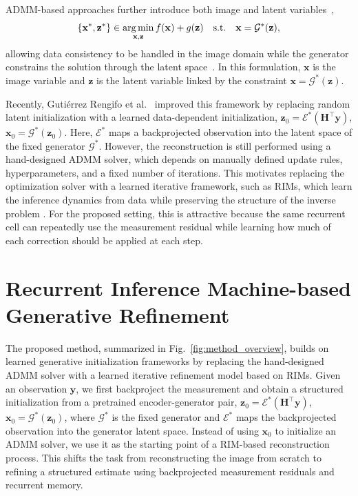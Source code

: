 \documentclass[conference]{IEEEtran}
\DeclareMathOperator*{\argmin}{arg\,min}
\begin{document}
ADMM-based approaches further introduce both image and latent variables~\cite{gutierrez2025learned},
\vspace{-2mm}
\begin{equation}
    \{\mathbf{x}^{\ast},\mathbf{z}^{\ast}\}
    \in
    \argmin_{\mathbf{x},\mathbf{z}}
    f(\mathbf{x}) + g(\mathbf{z})
    \quad
    \text{s.t.}
    \quad
    \mathbf{x}=\mathcal{G}^{\ast}(\mathbf{z}),
    \label{eq:admm_gp}
    \vspace{-2mm}
\end{equation}
allowing data consistency to be handled in the image domain while the generator constrains the solution through the latent space~\cite{gutierrez2025learned}. In this formulation, $\mathbf{x}$ is the image variable and $\mathbf{z}$ is the latent variable linked by the constraint $\mathbf{x}=\mathcal{G}^{\ast}(\mathbf{z})$.

Recently, Guti\'errez Rengifo et al.~\cite{gutierrez2025learned} improved this framework by replacing random latent initialization with a learned data-dependent initialization, $\mathbf{z}_0 = \mathcal{E}^{\ast}(\mathbf{H}^{\top}\mathbf{y})$, $\mathbf{x}_0 = \mathcal{G}^{\ast}(\mathbf{z}_0)$. Here, $\mathcal{E}^{\ast}$ maps a backprojected observation into the latent space of the fixed generator $\mathcal{G}^{\ast}$. However, the reconstruction is still performed using a hand-designed ADMM solver, which depends on manually defined update rules, hyperparameters, and a fixed number of iterations. This motivates replacing the optimization solver with a learned iterative framework, such as RIMs, which learn the inference dynamics from data while preserving the structure of the inverse problem \cite{putzky2017recurrent}. For the proposed setting, this is attractive because the same recurrent cell can repeatedly use the measurement residual while learning how much of each correction should be applied at each step.

\section{Recurrent Inference Machine-based Generative Refinement}

The proposed method, summarized in Fig.~\ref{fig:method_overview}, builds on learned generative initialization frameworks by replacing the hand-designed ADMM solver with a learned iterative refinement model based on RIMs. Given an observation $\mathbf{y}$, we first backproject the measurement and obtain a structured initialization from a pretrained encoder-generator pair, $\mathbf{z}_0 = \mathcal{E}^{\ast}(\mathbf{H}^{\top}\mathbf{y})$, $\mathbf{x}_0 = \mathcal{G}^{\ast}(\mathbf{z}_0)$, where $\mathcal{G}^{\ast}$ is the fixed generator and $\mathcal{E}^{\ast}$ maps the backprojected observation into the generator latent space. Instead of using $\mathbf{x}_0$ to initialize an ADMM solver, we use it as the starting point of a RIM-based reconstruction process. This shifts the task from reconstructing the image from scratch to refining a structured estimate using backprojected measurement residuals and recurrent memory.
\end{document}

